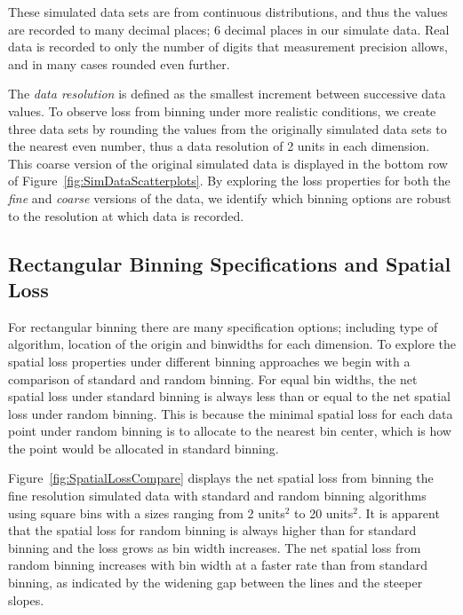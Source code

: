 \documentclass[11pt]{isuthesis}\usepackage[]{graphicx}\usepackage[]{color}
\begin{document}
These simulated data sets are from continuous distributions, and thus the values are recorded to many decimal places; 6 decimal places in our simulate data. Real data is recorded to only the number of digits that measurement precision allows, and in many cases rounded even further.

The \textit{data resolution} is defined as the smallest increment between successive data values. To observe loss from binning under more realistic conditions, we create three data sets by rounding the values from the originally simulated data sets to the nearest even number, thus a data resolution of 2 units in each dimension. This coarse version of the original simulated data is displayed in the bottom row of Figure~\ref{fig:SimDataScatterplots}. By exploring the loss properties for both the \textit{fine} and \textit{coarse} versions of the data, we identify which binning options are robust to the resolution at which data is recorded. 


\subsection{Rectangular Binning Specifications and Spatial Loss}

For rectangular binning there are many specification options; including type of algorithm, location of the origin and binwidths for each dimension. To explore the spatial loss properties under different binning approaches we begin with a comparison of standard and random binning. For equal bin widths, the net spatial loss under standard binning is always less than or equal to the net spatial loss under random binning. This is because the minimal spatial loss for each data point under random binning is to allocate to the nearest bin center, which is how the point would be allocated in standard binning. 

Figure~\ref{fig:SpatialLossCompare} displays the net spatial loss from binning the fine resolution simulated data with standard and random binning algorithms using square bins with a sizes ranging from 2 units$^2$ to 20 units$^2$. It is apparent that the spatial loss for random binning is always higher than for standard binning and the loss grows as bin width increases. The net spatial loss from random binning increases with bin width at a faster rate than from standard binning, as indicated by the widening gap between the lines and the steeper slopes.  
\end{document}
